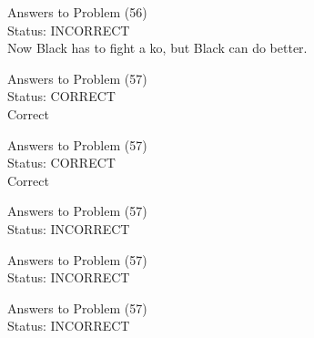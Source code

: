 \documentclass[11pt]{article}
\begin{document}
\begin{minipage}[t]{0.5\textwidth}
  {\centering
  
  Answers to Problem (56)\\
  Status: INCORRECT\\
  Now Black has to fight a ko, but Black can do better.\\
  }
\end{minipage}
\begin{minipage}[t]{0.5\textwidth}
  {\centering
  
  Answers to Problem (57)\\
  Status: CORRECT\\
  Correct\\
  }
\end{minipage}
\begin{minipage}[t]{0.5\textwidth}
  {\centering
  
  Answers to Problem (57)\\
  Status: CORRECT\\
  Correct\\
  }
\end{minipage}
\begin{minipage}[t]{0.5\textwidth}
  {\centering
  
  Answers to Problem (57)\\
  Status: INCORRECT\\
  
  }
\end{minipage}
\begin{minipage}[t]{0.5\textwidth}
  {\centering
  
  Answers to Problem (57)\\
  Status: INCORRECT\\
  
  }
\end{minipage}
\begin{minipage}[t]{0.5\textwidth}
  {\centering
  
  Answers to Problem (57)\\
  Status: INCORRECT\\
  
  }
\end{minipage}
\end{document}
